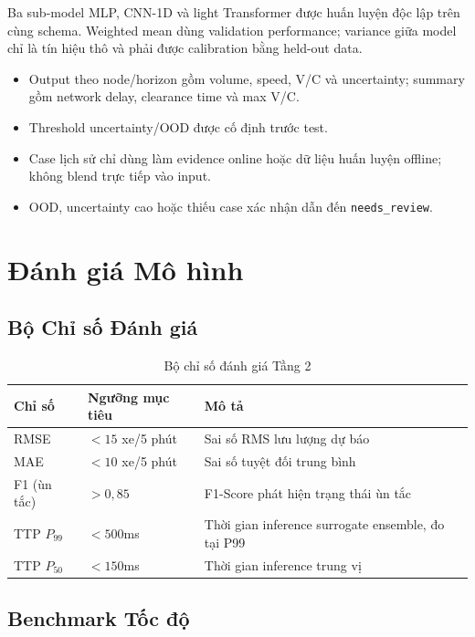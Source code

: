 Ba sub-model MLP, CNN-1D và light Transformer được huấn luyện độc lập trên cùng schema. Weighted mean dùng validation performance; variance giữa model chỉ là tín hiệu thô và phải được calibration bằng held-out data.

\begin{itemize}[itemsep=3pt]
  \item Output theo node/horizon gồm volume, speed, V/C và uncertainty; summary gồm network delay, clearance time và max V/C.
  \item Threshold uncertainty/OOD được cố định trước test.
  \item Case lịch sử chỉ dùng làm evidence online hoặc dữ liệu huấn luyện offline; không blend trực tiếp vào input.
  \item OOD, uncertainty cao hoặc thiếu case xác nhận dẫn đến \texttt{needs\_review}.
\end{itemize}

\section{Đánh giá Mô hình}

\subsection{Bộ Chỉ số Đánh giá}

\begin{table}[H]
\centering
\caption{Bộ chỉ số đánh giá Tầng 2}
\label{tab:metrics_t2}
\renewcommand{\arraystretch}{1.4}
\begin{tabular}{p{2.5cm} p{3.5cm} p{5.5cm}}
\toprule
\textbf{Chỉ số} & \textbf{Ngưỡng mục tiêu} & \textbf{Mô tả} \\
\midrule
RMSE & $< 15$ xe/5 phút & Sai số RMS lưu lượng dự báo \\
\rowcolor{rowgray}
MAE & $< 10$ xe/5 phút & Sai số tuyệt đối trung bình \\
F1 (ùn tắc) & $> 0{,}85$ & F1-Score phát hiện trạng thái ùn tắc \\
\rowcolor{rowgray}
TTP $P_{99}$ & $< 500$ms & Thời gian inference surrogate ensemble, đo tại P99 \\
TTP $P_{50}$ & $< 150$ms & Thời gian inference trung vị \\
\bottomrule
\end{tabular}
\end{table}

\subsection{Benchmark Tốc độ}

